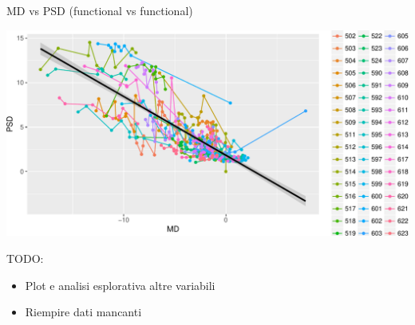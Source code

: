 \documentclass[ignorenonframetext,]{beamer}
\providecommand{\tightlist}{%
  \setlength{\itemsep}{0pt}\setlength{\parskip}{0pt}}
\begin{document}
\begin{frame}{MD vs PSD (functional vs functional)}

\includegraphics{analisi_exp_markdown_files/figure-beamer/unnamed-chunk-19-1.pdf}

\end{frame}

\begin{frame}{}

\end{frame}

\begin{frame}{TODO:}

\begin{itemize}
\tightlist
\item
  Plot e analisi esplorativa altre variabili
\item
  Riempire dati mancanti
\end{itemize}

\end{frame}
\end{document}
